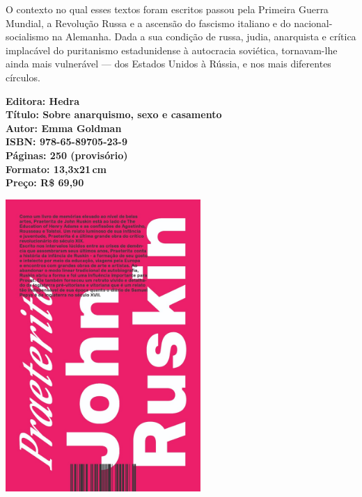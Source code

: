 O contexto no qual esses textos foram escritos passou pela Primeira Guerra Mundial, a Revolução Russa e a ascensão do fascismo italiano e do nacional-socialismo na Alemanha. Dada a sua condição de russa, judia, anarquista e crítica implacável do puritanismo estadunidense à autocracia soviética, tornavam-lhe ainda mais vulnerável --- dos Estados Unidos à Rússia, e nos mais diferentes círculos.


\vfill

\noindent\begin{minipage}[c]{.5\linewidth}
{\small\textbf{
\hspace*{-.1cm}Editora: Hedra\\
Título: Sobre anarquismo, sexo e casamento\\
Autor: Emma Goldman\\ 
ISBN: 978-65-89705-23-9\\
Páginas: 250 (provisório)\\
Formato: 13,3x21\,cm\\
Preço: R\$ 69,90\\
}}
\end{minipage}

\pagebreak


\begin{center}
\hspace*{-3.6cm}
\hspace*{3.1cm}\includegraphics[width=74mm]{./CAPAS/ruskin.jpg}
\end{center}

